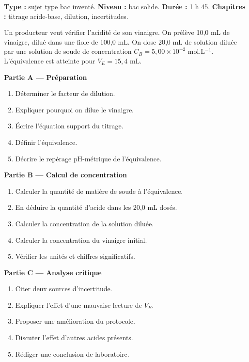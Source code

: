 \documentclass[11pt,a4paper]{article}
\begin{document}
\hypertarget{PC-LONG-01}{}
\begin{sujettype}
\textbf{Type :} sujet type bac inventé.  
\textbf{Niveau :} bac solide.  
\textbf{Durée :} 1 h 45.  
\textbf{Chapitres :} titrage acide-base, dilution, incertitudes.

Un producteur veut vérifier l'acidité de son vinaigre. On prélève 10,0 mL de vinaigre, dilué dans une fiole de 100,0 mL. On dose 20,0 mL de solution diluée par une solution de soude de concentration $C_B=5{,}00\times10^{-2}$ mol.L$^{-1}$. L'équivalence est atteinte pour $V_E=15{,}4$ mL.

\textbf{Partie A — Préparation}
\begin{enumerate}
  \item Déterminer le facteur de dilution.
  \item Expliquer pourquoi on dilue le vinaigre.
  \item Écrire l'équation support du titrage.
  \item Définir l'équivalence.
  \item Décrire le repérage pH-métrique de l'équivalence.
\end{enumerate}

\textbf{Partie B — Calcul de concentration}
\begin{enumerate}
  \item Calculer la quantité de matière de soude à l'équivalence.
  \item En déduire la quantité d'acide dans les 20,0 mL dosés.
  \item Calculer la concentration de la solution diluée.
  \item Calculer la concentration du vinaigre initial.
  \item Vérifier les unités et chiffres significatifs.
\end{enumerate}

\textbf{Partie C — Analyse critique}
\begin{enumerate}
  \item Citer deux sources d'incertitude.
  \item Expliquer l'effet d'une mauvaise lecture de $V_E$.
  \item Proposer une amélioration du protocole.
  \item Discuter l'effet d'autres acides présents.
  \item Rédiger une conclusion de laboratoire.
\end{enumerate}
\end{sujettype}
\end{document}
